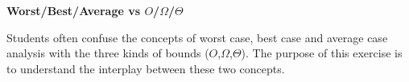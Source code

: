 \documentclass[12pt]{article}
\begin{document}
\newcommand{\I}{\mbox{{\em Int}}}
\newcommand{\lt}{\mbox{{\em left}}}
\newcommand{\rt}{\mbox{{\em right}}}
\newcommand{\ld}{\Delta^l}
\newcommand{\rd}{\Delta^r}
\newcommand{\lsp}[1]{\large\renewcommand{\baselinestretch}{#1}\normalsize}
\newcommand{\hsp}{\hspace{.2in}}

\def\Endwhile{\mbox{\bf endwhile\ }}
\def\Or{\mbox{\bf or\ }}
\def\Do{\mbox{\bf do\ }}
\def\Downto{\mbox{\bf downto\ }}
\def\Int{\mbox{\bf int\ }}
\def\To{\mbox{\bf to\ }}
\def\Repeat{\mbox{\bf repeat\ }}
\def\Until{\mbox{\bf until\ }}
\def\Return{\mbox{\bf return\ }}
\def\Not{\mbox{\bf not\ }}
\def\And{\mbox{\bf and\ }}
\def\For{\mbox{\bf for\ }}
\def\Foreach{\mbox{\bf foreach\ }}
\def\Else{\mbox{\bf else\ }}
\def\Elseif{\mbox{\bf elseif\ }}
\def\End{\mbox{\bf end\ }}
\def\If{\mbox{\bf if\ }}
\def\Mod{\mbox{\bf \ mod\ }}
\def\Then{\mbox{\bf then\ }}
\def\While{\mbox{\bf while\ }}
\def\Output{\mbox{\bf output\ }}


\lsp{1}
\pagestyle{plain}
\begin{center}
{\bf
Worst/Best/Average vs $O$/$\Omega$/$\Theta$
}
\end{center}

Students often confuse the concepts of worst case, best case and 
average case analysis with the three kinds of bounds ($O$,$\Omega$,$\Theta$).
The purpose of this exercise is to understand the interplay between these
two concepts. 
\end{document}
